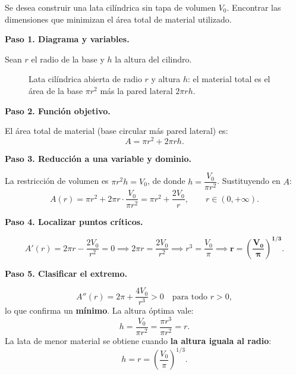 \begin{example}
Se desea construir una lata cilíndrica sin tapa de volumen $V_0$.
Encontrar las dimensiones que minimizan el área total de material
utilizado.
\begin{myproof}
\textbf{Paso 1. Diagrama y variables.}

Sean $r$ el radio de la base y $h$ la altura del cilindro.

\begin{figure}[H]
\centering
{}
\caption{Lata cilíndrica abierta de radio $r$ y altura $h$: el material total
  es el área de la base $\pi r^2$ más la pared lateral $2\pi r h$.}
\label{fig:lata_cilindrica}
\end{figure}

\textbf{Paso 2. Función objetivo.}

El área total de material (base circular más pared lateral) es:
\[
A = \pi r^2 + 2\pi r h.
\]

\textbf{Paso 3. Reducción a una variable y dominio.}

La restricción de volumen es $\pi r^2 h = V_0$, de donde
$h = \dfrac{V_0}{\pi r^2}$.
Sustituyendo en $A$:
\[
A(r) = \pi r^2 + 2\pi r \cdot \frac{V_0}{\pi r^2}
      = \pi r^2 + \frac{2V_0}{r}, \qquad r\in(0,+\infty).
\]

\textbf{Paso 4. Localizar puntos críticos.}

\[
A'(r) = 2\pi r - \frac{2V_0}{r^2} = 0
\implies 2\pi r = \frac{2V_0}{r^2}
\implies r^3 = \frac{V_0}{\pi}
\implies \boldsymbol{r = \left(\frac{V_0}{\pi}\right)^{1/3}}.
\]

\textbf{Paso 5. Clasificar el extremo.}

\[
A''(r) = 2\pi + \frac{4V_0}{r^3} > 0 \quad \text{para todo } r>0,
\]
lo que confirma un \textbf{mínimo}. La altura óptima vale:
\[
h = \frac{V_0}{\pi r^2}
  = \frac{\pi r^3}{\pi r^2} = r.
\]
La lata de menor material se obtiene cuando \textbf{la altura iguala
al radio}:
\[
\boxed{h = r = \left(\frac{V_0}{\pi}\right)^{1/3}.}
\]
\end{myproof}
\end{example}


